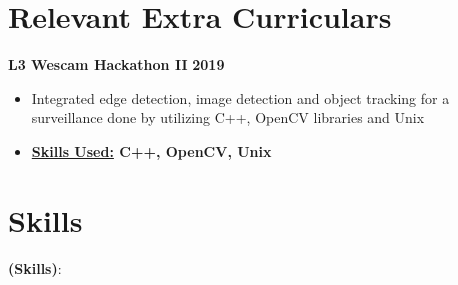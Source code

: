 \documentclass[11pt]{article}
\newcommand{\spaces}{1em}
\begin{document}
 
        \section*{Relevant Extra Curriculars}
            \textbf{L3 Wescam Hackathon II}  \hfill \textbf{2019}
            \begin{itemize}[noitemsep,nolistsep]
              \item Integrated edge detection, image detection and object tracking for a
                surveillance done by utilizing C++, OpenCV libraries and Unix
              \item \textbf{\underline{Skills Used:} C++, OpenCV, Unix}
	            \end{itemize}
                    \vspace{\spaces}
            

          \section*{Skills}

          \vspace{\spaces}

          \textbf{(Skills)}:
          
          \vspace{\spaces}
          


			                          
\end{document}
